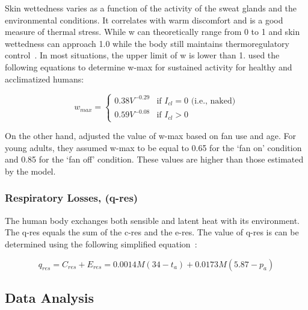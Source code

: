 Skin wettedness varies as a function of the activity of the sweat glands and the environmental conditions.
It correlates with warm discomfort and is a good measure of thermal stress.
While \ac{w} can theoretically range from 0 to 1 and skin wettedness can approach 1.0 while the body still maintains thermoregulatory control~\cite{ASHRA2017}.
In most situations, the upper limit of \ac{w} is lower than 1.
 used the following equations to determine \ac{w-max} for sustained activity for healthy and acclimatized humans:

\begin{equation}
    w_{max}=
\begin{cases}
    0.38 V^{-0.29} & \text{if } I_{cl} = 0 \text{ (i.e., naked)} \\
    0.59 V^{-0.08} & \text{if } I_{cl} > 0
\end{cases}
\end{equation}

On the other hand,  adjusted the value of \ac{w-max} based on fan use and age.
For young adults, they assumed \ac{w-max} to be equal to 0.65 for the `fan on' condition and 0.85 for the `fan off' condition.
These values are higher than those estimated by the  model.

\subsubsection{Respiratory Losses, (\acs{q-res})}
The human body exchanges both sensible and latent heat with its environment.
The \acf{q-res} equals the sum of the \ac{c-res} and the \ac{e-res}.
The value of \ac{q-res} is can be determined using the following simplified equation~\cite{ASHRA2017}:

\begin{equation}
    q_{res} = C_{res} + E_{res} = 0.0014M(34-t_{a}) + 0.0173M(5.87-p_{a})\label{eq:respiratory-losses}
\end{equation}

\subsection{Data Analysis}\label{subsec:data-analysis}

